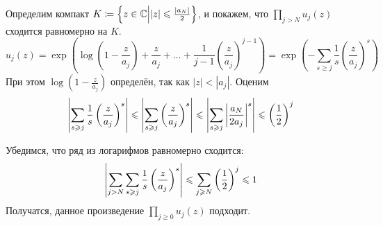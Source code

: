 \documentclass[a4paper]{report}
\begin{document}
{{            Определим компакт $K \coloneqq \left\{z \in \mathbb{C}\middle||z| \leqslant \frac{|a_N|}{2}\right\}$, и покажем, что $\prod\limits_{j > N}u_j(z)$ сходится равномерно на $K$.
            \[u_j(z) = \exp\left(\log\left(1 - \frac{z}{a_j}\right) + \frac{z}{a_j} + \dots + \frac{1}{j - 1}\left(\frac{z}{a_j}\right)^{j - 1}\right) = \exp\left(-\sum\limits_{s \ge j}\frac{1}{s}\left(\frac{z}{a_j}\right)^s\right)\]
            При этом $\log\left(1 - \frac{z}{a_j}\right)$ определён, так как $|z| < |a_j|$. Оценим
            \[\left|\sum\limits_{s \geqslant j}\frac{1}{s}\left(\frac{z}{a_j}\right)^s\right| \leqslant \left|\sum\limits_{s \geqslant j}\left(\frac{z}{a_j}\right)^s\right|\leqslant \left|\sum\limits_{s \geqslant j}\left|\frac{a_N}{2a_j}\right|^s\right| \leqslant \left(\frac{1}{2}\right)^j\]

            Убедимся, что ряд из логарифмов равномерно сходится:
            \[\left|\sum\limits_{j > N}\sum\limits_{s \geqslant j}\frac{1}{s}\left(\frac{z}{a_j}\right)^s\right| \leqslant \sum\limits_{j \geqslant N}\left(\frac{1}{2}\right)^j \leqslant 1\]
            Получатся, данное произведение $\prod\limits_{j \ge 0}u_j(z)$ подходит.
        }
    }
\end{document}

